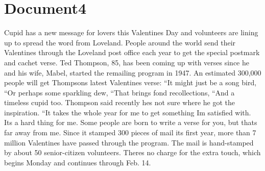 \documentclass{article}
\begin{document}
\color[rgb]{0,0,0}\section{Document4}
\color[rgb]{0.9372549019607843,0.48627450980392156,0.396078431372549}Cupid has a new message for lovers this Valentines Day and volunteers are lining up to spread the word from Loveland. People around the world send their Valentines through the Loveland post office each year to get the special postmark and cachet verse. Ted Thompson, 85, has been coming up with verses since he and his wife, Mabel, started the remailing program in 1947. An estimated 300,000 people will get Thompsons latest Valentines verse: ``It might just be a song bird, ``Or perhaps some sparkling dew, ``That brings fond recollections, ``And a timeless cupid too. Thompson said recently hes not sure where he got the inspiration. ``It takes the whole year for me to get something Im satisfied with. Its a hard thing for me. Some people are born to write a verse for you, but thats far away from me. Since it stamped 300 pieces of mail its first year, more than 7 million Valentines have passed through the program. The mail is hand-stamped by about 50 senior-citizen volunteers. Theres no charge for the extra touch, which begins Monday and continues through Feb. 14. 
\end{document}
